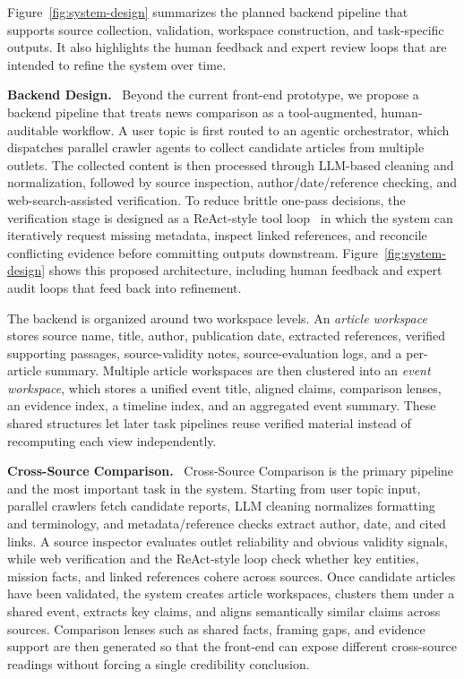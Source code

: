 \documentclass{vgtc}                          %
\newcommand{\methodsubhead}[1]{\vspace{0.55em}\noindent\textbf{#1.}\ }
\begin{document}
Figure~\ref{fig:system-design} summarizes the planned backend pipeline that supports source collection, validation, workspace construction, and task-specific outputs. It also highlights the human feedback and expert review loops that are intended to refine the system over time.


\methodsubhead{Backend Design}
Beyond the current front-end prototype, we propose a backend pipeline that treats news comparison as a tool-augmented, human-auditable workflow. A user topic is first routed to an agentic orchestrator, which dispatches parallel crawler agents to collect candidate articles from multiple outlets. The collected content is then processed through LLM-based cleaning and normalization, followed by source inspection, author/date/reference checking, and web-search-assisted verification. To reduce brittle one-pass decisions, the verification stage is designed as a ReAct-style tool loop~\cite{Yao_2023} in which the system can iteratively request missing metadata, inspect linked references, and reconcile conflicting evidence before committing outputs downstream. Figure~\ref{fig:system-design} shows this proposed architecture, including human feedback and expert audit loops that feed back into refinement.

The backend is organized around two workspace levels. An \emph{article workspace} stores source name, title, author, publication date, extracted references, verified supporting passages, source-validity notes, source-evaluation logs, and a per-article summary. Multiple article workspaces are then clustered into an \emph{event workspace}, which stores a unified event title, aligned claims, comparison lenses, an evidence index, a timeline index, and an aggregated event summary. These shared structures let later task pipelines reuse verified material instead of recomputing each view independently.

\methodsubhead{Cross-Source Comparison}
Cross-Source Comparison is the primary pipeline and the most important task in the system. Starting from user topic input, parallel crawlers fetch candidate reports, LLM cleaning normalizes formatting and terminology, and metadata/reference checks extract author, date, and cited links. A source inspector evaluates outlet reliability and obvious validity signals, while web verification and the ReAct-style loop check whether key entities, mission facts, and linked references cohere across sources. Once candidate articles have been validated, the system creates article workspaces, clusters them under a shared event, extracts key claims, and aligns semantically similar claims across sources. Comparison lenses such as shared facts, framing gaps, and evidence support are then generated so that the front-end can expose different cross-source readings without forcing a single credibility conclusion.
\end{document}
